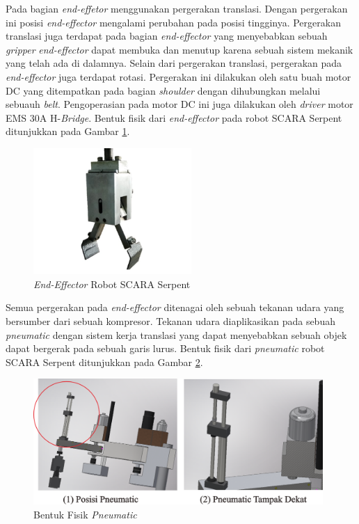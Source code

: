 Pada bagian \textit{end-effetor} menggunakan pergerakan translasi. Dengan pergerakan ini posisi \textit{end-effector} mengalami perubahan pada posisi tingginya. Pergerakan translasi juga terdapat pada bagian \textit{end-effector} yang menyebabkan sebuah \textit{gripper }\textit{ end-effector} dapat membuka dan menutup karena sebuah sistem mekanik yang telah ada di dalamnya. Selain dari pergerakan translasi, pergerakan pada \textit{end-effector} juga terdapat rotasi. Pergerakan ini dilakukan oleh satu buah motor DC yang ditempatkan pada bagian \textit{shoulder} dengan dihubungkan melalui sebuauh \textit{belt}. Pengoperasian pada motor DC ini juga dilakukan oleh \textit{driver} motor EMS 30A H-\textit{Bridge}. Bentuk fisik dari \textit{end-effector} pada robot SCARA Serpent ditunjukkan pada Gambar \ref{pic.endeffectorfisik}.
\begin{figure}[H]
	\centering
	\includegraphics[width=6cm]{gambar/capitsementara.jpg}
	\caption{\textit{End-Effector} Robot SCARA Serpent}
	\label{pic.endeffectorfisik}
	
\end{figure}
Semua pergerakan pada \textit{end-effector} ditenagai oleh sebuah tekanan udara yang bersumber dari sebuah kompresor. Tekanan udara diaplikasikan pada sebuah \textit{pneumatic} dengan sistem kerja translasi yang dapat menyebabkan sebuah objek dapat bergerak pada sebuah garis lurus. Bentuk fisik dari \textit{pneumatic} robot SCARA Serpent ditunjukkan pada Gambar \ref{pic.pneumatic}.
\begin{figure}[H]
	\centering
	\includegraphics[width=11cm]{gambar/pneumatic.png}
	\caption{Bentuk Fisik \textit{Pneumatic}}
	\label{pic.pneumatic}
\end{figure}
